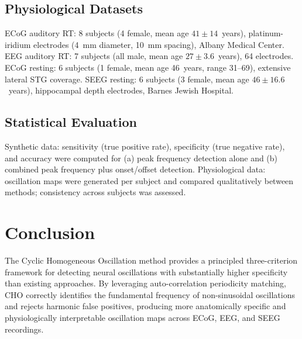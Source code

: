 \documentclass[11pt]{article}
\begin{document}
\subsection{Physiological Datasets}
ECoG auditory RT: 8 subjects (4 female, mean age $41 \pm 14$~years), platinum-iridium electrodes (4~mm diameter, 10~mm spacing), Albany Medical Center. EEG auditory RT: 7 subjects (all male, mean age $27 \pm 3.6$~years), 64 electrodes. ECoG resting: 6 subjects (1 female, mean age 46~years, range 31--69), extensive lateral STG coverage. SEEG resting: 6 subjects (3 female, mean age $46 \pm 16.6$~years), hippocampal depth electrodes, Barnes Jewish Hospital.

\subsection{Statistical Evaluation}
Synthetic data: sensitivity (true positive rate), specificity (true negative rate), and accuracy were computed for (a) peak frequency detection alone and (b) combined peak frequency plus onset/offset detection. Physiological data: oscillation maps were generated per subject and compared qualitatively between methods; consistency across subjects was assessed.

\section{Conclusion}

The Cyclic Homogeneous Oscillation method provides a principled three-criterion framework for detecting neural oscillations with substantially higher specificity than existing approaches. By leveraging auto-correlation periodicity matching, CHO correctly identifies the fundamental frequency of non-sinusoidal oscillations and rejects harmonic false positives, producing more anatomically specific and physiologically interpretable oscillation maps across ECoG, EEG, and SEEG recordings.



\end{document}
